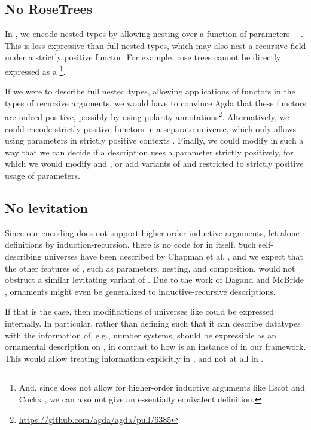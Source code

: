 \subsection{No RoseTrees}
In , we encode nested types by allowing nesting over a function of parameters \ \ . This is less expressive than full nested types, which may also nest a recursive field under a strictly positive functor. For example, rose trees
cannot be directly expressed as a \footnote{And, since  does not allow for higher-order inductive arguments like Escot and Cockx \cite{practgen}, we can also not give an essentially equivalent definition.}.


If we were to describe full nested types, allowing applications of functors in the types of recursive arguments, we would have to convince Agda that these functors are indeed positive, possibly by using polarity annotations\footnote{\url{https://github.com/agda/agda/pull/6385}}. Alternatively, we could encode strictly positive functors in a separate universe, which only allows using parameters in strictly positive contexts \cite{sijsling}. Finally, we could modify  in such a way that we can decide if a description uses a parameter strictly positively, for which we would modify  and , or add variants of  and  restricted to strictly positive usage of parameters.


\subsection{No levitation}
Since our encoding does not support higher-order inductive arguments, let alone definitions by induction-recursion, there is no code for  in itself. Such self-describing universes have been described by Chapman et al. \cite{levitation}, and we expect that the other features of , such as parameters, nesting, and composition, would not obstruct a similar levitating variant of . Due to the work of Dagand and McBride \cite{orntrans}, ornaments might even be generalized to inductive-recursive descriptions.

If that is the case, then modifications of universes like  could be expressed internally. In particular, rather than defining  such that it can describe datatypes with the information of, e.g., number systems,  should be expressible as an ornamental description on , in contrast to how  is an instance of  in our framework. This would allow treating information explicitly in , and not at all in .

